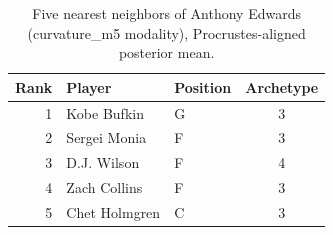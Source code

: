\begin{table}[htbp]
  \centering\small
  \begin{tabular}{rllc}
    \toprule
    Rank & Player & Position & Archetype \\
    \midrule
    1 & Kobe Bufkin & G & 3 \\
    2 & Sergei Monia & F & 3 \\
    3 & D.J. Wilson & F & 4 \\
    4 & Zach Collins & F & 3 \\
    5 & Chet Holmgren & C & 3 \\
    \bottomrule
  \end{tabular}
  \caption{Five nearest neighbors of Anthony Edwards (curvature_m5 modality), Procrustes-aligned posterior mean.}
  \label{tab:Anthony_Edwards_neighbors_curvature_m5}
\end{table}

